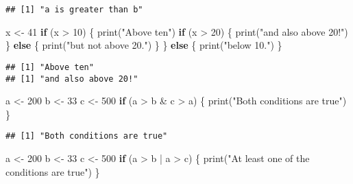 \documentclass[
]{article}
\newenvironment{Shaded}{\begin{snugshade}}{\end{snugshade}}
\newcommand{\ControlFlowTok}[1]{\textcolor[rgb]{0.13,0.29,0.53}{\textbf{#1}}}
\newcommand{\DecValTok}[1]{\textcolor[rgb]{0.00,0.00,0.81}{#1}}
\newcommand{\FunctionTok}[1]{\textcolor[rgb]{0.00,0.00,0.00}{#1}}
\newcommand{\NormalTok}[1]{#1}
\newcommand{\OtherTok}[1]{\textcolor[rgb]{0.56,0.35,0.01}{#1}}
\newcommand{\SpecialCharTok}[1]{\textcolor[rgb]{0.00,0.00,0.00}{#1}}
\newcommand{\StringTok}[1]{\textcolor[rgb]{0.31,0.60,0.02}{#1}}
\begin{document}
\begin{verbatim}
## [1] "a is greater than b"
\end{verbatim}

\begin{Shaded}
\begin{Highlighting}[]
\NormalTok{x }\OtherTok{\textless{}{-}} \DecValTok{41}
\ControlFlowTok{if}\NormalTok{ (x }\SpecialCharTok{\textgreater{}} \DecValTok{10}\NormalTok{) \{}
  \FunctionTok{print}\NormalTok{(}\StringTok{"Above ten"}\NormalTok{) }
  \ControlFlowTok{if}\NormalTok{ (x }\SpecialCharTok{\textgreater{}} \DecValTok{20}\NormalTok{) \{}
    \FunctionTok{print}\NormalTok{(}\StringTok{"and also above 20!"}\NormalTok{) }
\NormalTok{  \} }\ControlFlowTok{else}\NormalTok{ \{}
    \FunctionTok{print}\NormalTok{(}\StringTok{"but not above 20."}\NormalTok{)}
\NormalTok{  \} }
\NormalTok{\} }\ControlFlowTok{else}\NormalTok{ \{}
  \FunctionTok{print}\NormalTok{(}\StringTok{"below 10."}\NormalTok{)}
\NormalTok{\}}
\end{Highlighting}
\end{Shaded}

\begin{verbatim}
## [1] "Above ten"
## [1] "and also above 20!"
\end{verbatim}

\begin{Shaded}
\begin{Highlighting}[]
\NormalTok{a }\OtherTok{\textless{}{-}} \DecValTok{200} 
\NormalTok{b }\OtherTok{\textless{}{-}} \DecValTok{33} 
\NormalTok{c }\OtherTok{\textless{}{-}} \DecValTok{500}
\ControlFlowTok{if}\NormalTok{ (a }\SpecialCharTok{\textgreater{}}\NormalTok{ b }\SpecialCharTok{\&}\NormalTok{ c }\SpecialCharTok{\textgreater{}}\NormalTok{ a) \{}
  \FunctionTok{print}\NormalTok{(}\StringTok{"Both conditions are true"}\NormalTok{)}
\NormalTok{\}}
\end{Highlighting}
\end{Shaded}

\begin{verbatim}
## [1] "Both conditions are true"
\end{verbatim}

\begin{Shaded}
\begin{Highlighting}[]
\NormalTok{a }\OtherTok{\textless{}{-}} \DecValTok{200} 
\NormalTok{b }\OtherTok{\textless{}{-}} \DecValTok{33} 
\NormalTok{c }\OtherTok{\textless{}{-}} \DecValTok{500}
\ControlFlowTok{if}\NormalTok{ (a }\SpecialCharTok{\textgreater{}}\NormalTok{ b }\SpecialCharTok{|}\NormalTok{ a }\SpecialCharTok{\textgreater{}}\NormalTok{ c) \{}
  \FunctionTok{print}\NormalTok{(}\StringTok{"At least one of the conditions are true"}\NormalTok{)}
\NormalTok{\}}
\end{Highlighting}
\end{Shaded}
\end{document}
